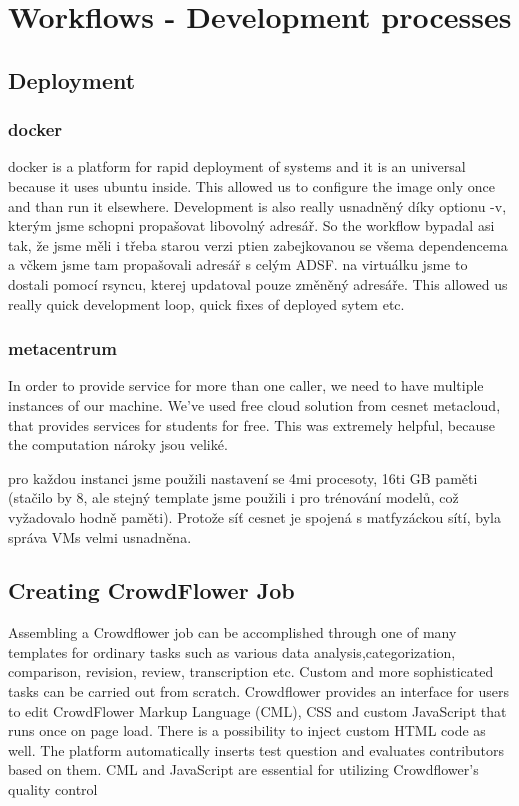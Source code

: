\chapter{Workflows - Development processes}

\section{Deployment}

\subsection{docker}

docker is a platform for rapid deployment of systems and it is an universal because it uses ubuntu inside. This allowed us to configure the image only once and than run it elsewhere. Development is also really usnadněný díky optionu -v, kterým jsme schopni propašovat libovolný adresář. So the workflow bypadal asi tak, že jsme měli i třeba starou verzi ptien zabejkovanou se všema dependencema a včkem jsme tam propašovali adresář s celým ADSF. na virtuálku jsme to dostali pomocí rsyncu, kterej updatoval pouze změněný adresáře. This allowed us really quick development loop, quick fixes of deployed sytem etc.

\subsection{metacentrum}

In order to provide service for more than one caller, we need to have multiple instances of our machine. We've used free cloud solution from cesnet metacloud, that provides services for students for free. This was extremely helpful, because the computation nároky jsou veliké.

pro každou instanci jsme použili nastavení se 4mi procesoty, 16ti GB paměti (stačilo by 8, ale stejný template jsme použili i pro trénování modelů, což vyžadovalo hodně paměti). Protože síť cesnet je spojená s matfyzáckou sítí, byla správa VMs velmi usnadněna.


\section{Creating CrowdFlower Job}

Assembling a Crowdflower job can be accomplished through one of many templates for ordinary tasks such as various data analysis,categorization, comparison, revision, review, transcription etc. %
Custom and more sophisticated tasks can be carried out from scratch.
Crowdflower provides an interface for users to edit CrowdFlower Markup Language (CML), CSS and custom JavaScript that runs once on page load.
There is a possibility to inject custom HTML code as well.
The platform automatically inserts test question and evaluates contributors based on them.
CML and JavaScript are essential for utilizing Crowdflower's quality control

